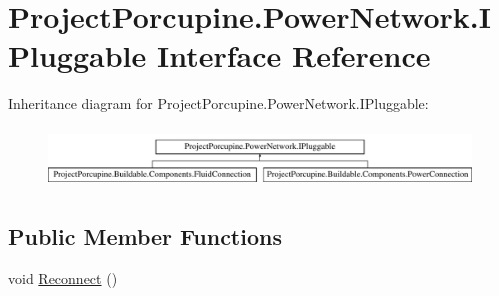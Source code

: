 \hypertarget{interface_project_porcupine_1_1_power_network_1_1_i_pluggable}{}\section{Project\+Porcupine.\+Power\+Network.\+I\+Pluggable Interface Reference}
\label{interface_project_porcupine_1_1_power_network_1_1_i_pluggable}
Inheritance diagram for Project\+Porcupine.\+Power\+Network.\+I\+Pluggable\+:\begin{figure}[H]
\begin{center}
\leavevmode
\includegraphics[height=1.595442cm]{interface_project_porcupine_1_1_power_network_1_1_i_pluggable}
\end{center}
\end{figure}
\subsection*{Public Member Functions}
\begin{DoxyCompactItemize}
\item 
void \hyperlink{interface_project_porcupine_1_1_power_network_1_1_i_pluggable_aa18de95686be030b51cbf97051244e8d}{Reconnect} ()
\end{DoxyCompactItemize}
